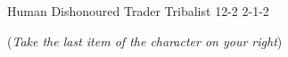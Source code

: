 
\renewcommand\charSpellList{}
\begin{filledCS}%
  {\composeHumanName}%
  {Human}%
  {Dishonoured Trader}%
  {Tribalist}%
  {{1}{2}{-2}}%
  {{2}{-1}{-2}}%
  {%
    \setcounter{Academics}{1}
    \setcounter{Empathy}{1}
    \setcounter{Larceny}{2}
    \setcounter{Vigilance}{1}
    \setcounter{Survival}{1}

    \setcounter{Projectiles}{1}
    \maul
    \partialleather
  }%
  {\adrenalinesurge}%
  {(\textit{Take the last item of the character on your right})}%
  \renewcommand\rank{Fodder}
  \renewcommand\characterDebt{100 \glspl{sp}}

\end{filledCS}


